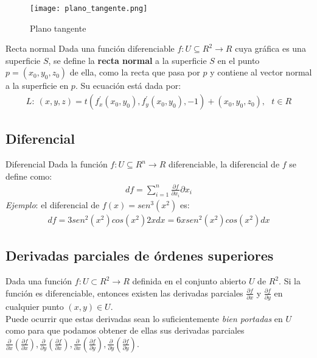 \documentclass[a4paper, twoside]{article}
\numberwithin{equation}{section}
\numberwithin{figure}{section}
\numberwithin{table}{section}
\begin{document}
\begin{minipage}{0.25\textwidth}
	\begin{figure}[H]
		\texttt{[image: plano\_tangente.png]}
		\caption{Plano tangente}
	\end{figure}
\end{minipage}
\begin{minipage}{0.8\textwidth}
	\begin{definicion*}{Recta normal}
		Dada una función diferenciable $f:U\subseteq R^2 \rightarrow R$ cuya gráfica es una superficie $S$, se define la \textbf{recta normal} a la superficie $S$ en el punto $p=(x_0,y_0,z_0)$ de ella, como la recta que pasa por $p$ y contiene al vector normal a la superficie en $p.$ Su ecuación está dada por:
		\begin{align}
			L:\:(x,y,z)=t(f^\prime_{x}(x_0,y_0),f^\prime_{y}(x_0,y_0),-1)+(x_0,y_0,z_0), \text{ } t \in R
		\end{align}
	\end{definicion*}
\end{minipage}

\subsection{Diferencial}
\begin{definicion*}{Diferencial}
	Dada la función $f:U\subseteq R^n \rightarrow R$ diferenciable, la diferencial de $f$ se define como:
	\begin{align}
		df=\sum_{i=1}^{n}\frac{\partial f}{\partial x_i}\partial x_i
	\end{align}
	\textit{Ejemplo}: el diferencial de $f(x)=sen^3(x^2)$ es:
	\begin{align}
		df=3sen^2(x^2)cos(x^2)2xdx=6xsen^2(x^2)cos(x^2)dx
	\end{align}
\end{definicion*}

\subsection{Derivadas parciales de órdenes superiores}
Dada una función $f: U \subset R^2 \rightarrow R$ definida en el conjunto abierto $U$ de $R^2$. Si la función es diferenciable, entonces existen las derivadas parciales $\frac{\partial f}{\partial x}$ y $\frac{\partial f}{\partial y}$ en cualquier punto $(x,y)\in U$.\\

Puede ocurrir que estas derivadas sean lo suficientemente \emph{bien portadas} en $U$ como para que podamos obtener de ellas sus derivadas parciales $\frac{\partial}{\partial x}\left(\frac{\partial f}{\partial x}\right),\frac{\partial}{\partial y}\left(\frac{\partial f}{\partial x}\right),\frac{\partial}{\partial x}\left(\frac{\partial f}{\partial y}\right),\frac{\partial}{\partial y}\left(\frac{\partial f}{\partial y}\right)$.\\
\end{document}
